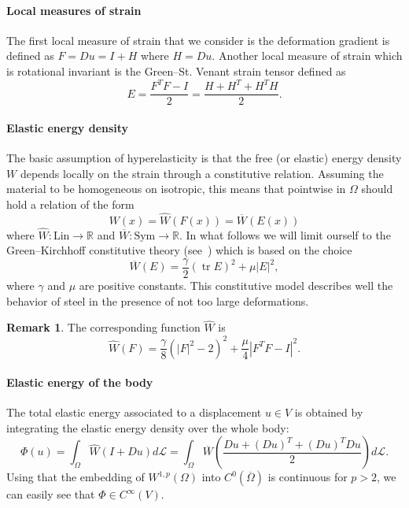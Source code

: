 \documentclass[a4paper,11pt]{article}
\theoremstyle{definition}
\newtheorem{rmk}[prop]{Remark}
\DeclareMathOperator{\tr}{tr}
\begin{document}
\paragraph{Local measures of strain} The first local measure of strain that we consider is the deformation gradient is defined as $F=Du=I+H$ where $H=Du$. Another local measure of strain which is rotational invariant is the Green--St. Venant strain tensor defined as
\[
E=\frac{F^TF-I}{2}=\frac{H+H^T+H^TH}{2}.
\] 

\paragraph{Elastic energy density} The basic assumption of hyperelasticity is that the free (or elastic) energy density $W$ depends locally on the strain through a constitutive relation. Assuming the material to be homogeneous on isotropic, this means that pointwise in $\Omega$ should hold a relation of the form
\[
W(x)=\hat{W}(F(x))=\overline{W}(E(x))
\]
where $\hat{W}\colon\text{Lin}\to\mathbb{R}$ and $\overline{W}\colon\text{Sym}\to\mathbb{R}$. In what follows we will limit ourself to the Green--Kirchhoff constitutive theory (see~\cite{truesdell-noll}) which is based on the choice
\[
\overline{W}(E)=\frac{\gamma}{2}(\tr E)^2+\mu|E|^2,
\]
where $\gamma$ and $\mu$ are positive constants. This constitutive model describes well the behavior of steel in the presence of not too large deformations.

\begin{rmk}
The corresponding function $\hat{W}$ is
\[
\hat{W}(F)=\frac{\gamma}{8}\left(|F|^2-2\right)^2+\frac{\mu}{4}\left|F^TF-I\right|^2.
\]
\end{rmk}

\paragraph{Elastic energy of the body} The total elastic energy associated to a displacement $u\in V$ is obtained by integrating the elastic energy density over the whole body:
\[
\Phi(u)=\int_\Omega\hat W(I+Du)d\mathscr{L}=\int_\Omega\overline W\left(\frac{Du+(Du)^T+(Du)^TDu}{2}\right)d\mathscr{L}.
\]
Using that the embedding of $W^{1,p}(\Omega)$ into $C^0(\overline\Omega)$ is continuous for $p>2$, we can easily see that $\Phi\in C^\infty(V)$.
\end{document}
